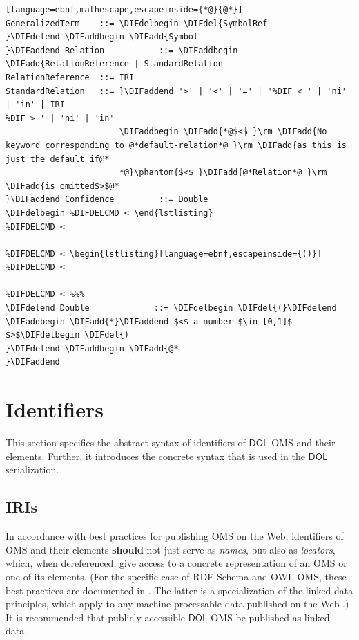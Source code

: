 \documentclass[10pt,fleqn,final]{scrreprt}
\makeatletter
\newcommand*\CommentAuthor{}
\renewcommand*\CommentAuthor{#1}}
\newcommand*\CommentDate{}
\renewcommand*\CommentDate{#1}}
\newcommand*\CommentId{}
\renewcommand*\CommentId{#1}}
\newcommand*\CommentType{}
\renewcommand*\CommentType{#1}}
\newcommand*{\SetCommentColorByType}[1]{%
\edef\localType{{#1}}%
\expandafter\ifstrequal\localType{q-aut}{\colorlet{CommentColor}{red}}{%
\expandafter\ifstrequal\localType{q-all}{\colorlet{CommentColor}{orange}}{%
\expandafter\ifstrequal\localType{todo}{\colorlet{CommentColor}{orange}}{%
\expandafter\ifstrequal\localType{fyi}{\colorlet{CommentColor}{lightgray}}{%
\colorlet{CommentColor}{yellow}}}}}}
\newcommand*{\SetCommentPrefixByType}[1]{%
\edef\localType{{#1}}%
\expandafter\@ifmtarg\localType{%
\edef\CommentPrefix{}%
}{%
\caseupper[q]{#1}%
\edef\CommentPrefix{\thestring: }%
}}
\newcommand*{\initComment}[1]{%
\setkeys{Comment}{#1}%
\SetCommentColorByType{\CommentType}%
\relax%
\SetCommentPrefixByType{\CommentType}%
\relax%
}
\newcommand*{\todonote}[2][]{%
\initComment{#1}%
\pdfcomment[author=\CommentAuthor,color=CommentColor,date=\CommentDate,id=\CommentId]{%
\CommentPrefix
#2}}
\renewcommand*{\todonote}[2][]{%
\initComment{#1}%
\ednote{\CommentPrefix #2}}
\newcommand*{\CLnote}[2][author=Christoph Lange]{%
\todonote[author=Christoph Lange,#1]{#2} 
}
\newcommand*{\should}{\textbf{should}\xspace}
\newcommand*{\DOL}{\ensuremath{\mathsf{DOL}}\xspace}
\newcommand{\sclause}[1]{\section{#1}}
\newcommand{\ssclause}[1]{\subsection{#1}}
\newenvironment{definitions}[0]{\medskip }{}
\providecommand{\DIFadd}[1]{{\protect\color{blue}\uwave{#1}}} %
\providecommand{\DIFdel}[1]{{\protect\color{red}\sout{#1}}}                      %
\providecommand{\DIFaddbegin}{} %
\providecommand{\DIFaddend}{} %
\providecommand{\DIFdelbegin}{} %
\providecommand{\DIFdelend}{} %
\makeatother
\begin{document}
\begin{definitions}
\begin{lstlisting}[language=ebnf,mathescape,escapeinside={*@}{@*}]
GeneralizedTerm    ::= \DIFdelbegin \DIFdel{SymbolRef
}\DIFdelend \DIFaddbegin \DIFadd{Symbol
}\DIFaddend Relation           ::= \DIFaddbegin \DIFadd{RelationReference | StandardRelation
RelationReference  ::= IRI
StandardRelation   ::= }\DIFaddend '>' | '<' | '=' | '%DIF < ' | 'ni' | 'in' | IRI
%DIF > ' | 'ni' | 'in'
                       \DIFaddbegin \DIFadd{*@$<$ }\rm \DIFadd{No keyword corresponding to @*default-relation*@ }\rm \DIFadd{as this is just the default if@*
                       *@}\phantom{$<$ }\DIFadd{@*Relation*@ }\rm \DIFadd{is omitted$>$@*
}\DIFaddend Confidence         ::= Double
\DIFdelbegin %DIFDELCMD < \end{lstlisting}


\DIFdelend Double             ::= \DIFdelbegin \DIFdel{(}\DIFdelend \DIFaddbegin \DIFadd{*}\DIFaddend $<$ a number $\in [0,1]$ $>$\DIFdelbegin \DIFdel{) 
}\DIFdelend \DIFaddbegin \DIFadd{@*
}\DIFaddend \end{lstlisting}






\sclause{Identifiers}\label{c:identifiers}
This section specifies the abstract syntax of identifiers of \DOL OMS and their elements. Further, 
it introduces the concrete syntax that is used in the \DOL serialization. 
\DIFdelbegin %

\DIFdelend \ssclause{IRIs}\label{c:iris}


In accordance with best practices for publishing OMS on the Web, identifiers of OMS and their 
elements \should not just serve as \emph{names}, but also as \emph{locators}, which, when 
dereferenced, give access to a concrete representation of an OMS or one of its elements.  (For the 
specific case of RDF Schema and OWL OMS, these best practices are documented in 
\cite{W3C:NOTE-swbp-vocab-pub-20080828}.  The latter is a specialization of the linked data 
principles, which apply to any machine-processable data published on the Web 
\cite{BernersLee:LinkedData2006}.)  It is recommended that publicly accessible \DOL OMS be published 
as linked data.


\end{definitions}
\end{document}
